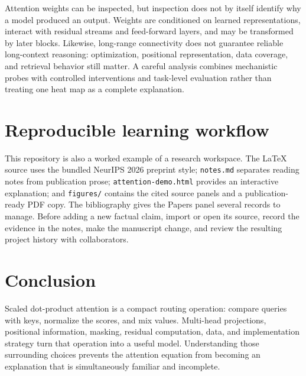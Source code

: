 \documentclass{article}
\begin{document}
Attention weights can be inspected, but inspection does not by itself identify why a model produced an output.
Weights are conditioned on learned representations, interact with residual streams and feed-forward layers, and may be transformed by later blocks.
Likewise, long-range connectivity does not guarantee reliable long-context reasoning: optimization, positional representation, data coverage, and retrieval behavior still matter.
A careful analysis combines mechanistic probes with controlled interventions and task-level evaluation rather than treating one heat map as a complete explanation.

\section{Reproducible learning workflow}

This repository is also a worked example of a research workspace.
The LaTeX source uses the bundled NeurIPS 2026 preprint style; \texttt{notes.md} separates reading notes from publication prose; \texttt{attention-demo.html} provides an interactive explanation; and \texttt{figures/} contains the cited source panels and a publication-ready PDF copy.
The bibliography gives the Papers panel several records to manage.
Before adding a new factual claim, import or open its source, record the evidence in the notes, make the manuscript change, and review the resulting project history with collaborators.

\section{Conclusion}

Scaled dot-product attention is a compact routing operation: compare queries with keys, normalize the scores, and mix values.
Multi-head projections, positional information, masking, residual computation, data, and implementation strategy turn that operation into a useful model.
Understanding those surrounding choices prevents the attention equation from becoming an explanation that is simultaneously familiar and incomplete.



\end{document}
